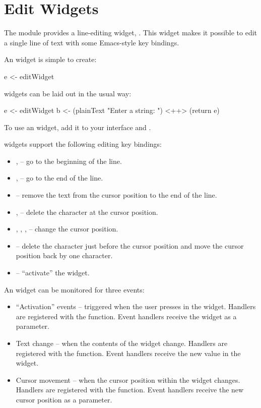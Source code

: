 \section{Edit Widgets}
\label{sec:edit}

The  module provides a line-editing widget, .
This widget makes it possible to edit a single line of text with some
Emacs-style key bindings.

An  widget is simple to create:

\begin{haskellcode}
 e <- editWidget
\end{haskellcode}

 widgets can be laid out in the usual way:

\begin{haskellcode}
 e <- editWidget
 b <- (plainText "Enter a string: ") <++> (return e)
\end{haskellcode}

To use an  widget, add it to your interface and
.

 widgets support the following editing key bindings:

\begin{itemize}
\item {},  -- go to the beginning of the line.
\item {},  -- go to the end of the line.
\item {} -- remove the text from the cursor position to the
  end of the line.
\item {},  -- delete the character at the cursor
  position.
\item {}, , ,  -- change the cursor
  position.
\item {} -- delete the character just before the cursor
  position and move the cursor position back by one character.
\item {} -- ``activate'' the  widget.
\end{itemize}

An  widget can be monitored for three events:

\begin{itemize}
\item ``Activation'' events -- triggered when the user presses
   in the  widget.  Handlers are registered with
  the  function.  Event handlers receive the 
  widget as a parameter.
\item Text change -- when the contents of the  widget change.
  Handlers are registered with the  function.  Event
  handlers receive the new  value in the  widget.
\item Cursor movement -- when the cursor position within the 
  widget changes.  Handlers are registered with the 
  function.  Event handlers receive the new cursor position as a
  parameter.
\end{itemize}

